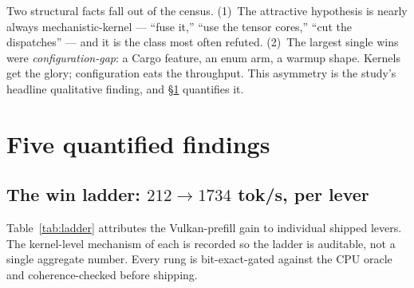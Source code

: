 \documentclass[11pt]{article}
\begin{document}
Two structural facts fall out of the census. (1)~The attractive hypothesis is nearly always
mechanistic-kernel --- ``fuse it,'' ``use the tensor cores,'' ``cut the dispatches'' --- and it is the
class most often refuted. (2)~The largest single wins were \emph{configuration-gap}: a Cargo feature, an
enum arm, a warmup shape. Kernels get the glory; configuration eats the throughput. This asymmetry is the
study's headline qualitative finding, and \S\ref{sec:findings} quantifies it.

\section{Five quantified findings}
\label{sec:findings}

\subsection{The win ladder: $212\to1734$ tok/s, per lever}
\label{sec:ladder}

Table~\ref{tab:ladder} attributes the Vulkan-prefill gain to individual shipped levers. The kernel-level
mechanism of each is recorded so the ladder is auditable, not a single aggregate number. Every rung is
bit-exact-gated against the CPU oracle and coherence-checked before shipping.
\end{document}
